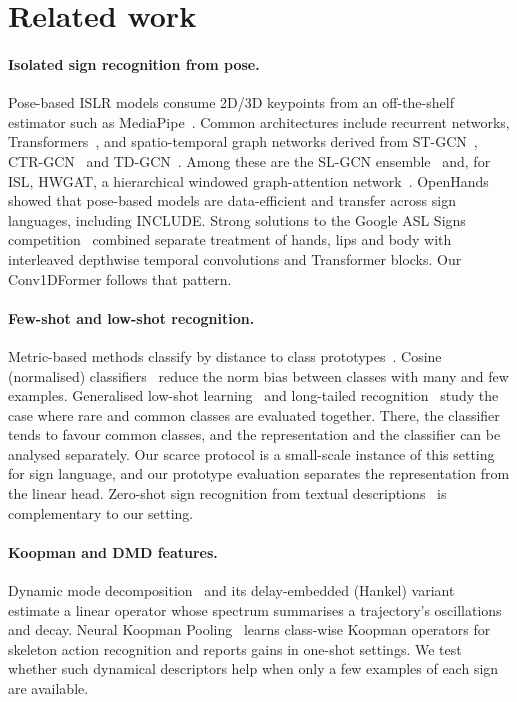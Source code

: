 \documentclass[11pt]{article}
\begin{document}
\section{Related work}

\paragraph{Isolated sign recognition from pose.}
Pose-based ISLR models consume 2D/3D keypoints from an off-the-shelf estimator such as
MediaPipe~\citep{lugaresi2019mediapipe}. Common architectures include recurrent networks,
Transformers~\citep{vaswani2017attention}, and spatio-temporal graph networks derived from
ST-GCN~\citep{yan2018stgcn}, CTR-GCN~\citep{chen2021ctrgcn} and TD-GCN~\citep{liu2024tdgcn}.
Among these are the SL-GCN ensemble~\citep{jiang2021sam} and, for ISL, HWGAT, a hierarchical
windowed graph-attention network~\citep{patra2024hwgat}. OpenHands~\citep{selvaraj2022openhands}
showed that pose-based models are data-efficient and transfer across sign languages,
including INCLUDE. Strong solutions to the Google ASL Signs competition~\citep{kaggle2023aslsigns}
combined separate treatment of hands, lips and body with interleaved depthwise temporal
convolutions and Transformer blocks. Our Conv1DFormer follows that pattern.

\paragraph{Few-shot and low-shot recognition.}
Metric-based methods classify by distance to class prototypes~\citep{snell2017proto}. Cosine
(normalised) classifiers~\citep{gidaris2018dynamic,qi2018imprinted,chen2019closer} reduce
the norm bias between classes with many and few examples. Generalised low-shot
learning~\citep{hariharan2017lowshot} and long-tailed recognition~\citep{kang2020decoupling}
study the case where rare and common classes are evaluated together. There, the classifier
tends to favour common classes, and the representation and the classifier can be analysed
separately. Our scarce protocol is a small-scale instance of this setting for sign language,
and our prototype evaluation separates the representation from the linear head. Zero-shot
sign recognition from textual descriptions~\citep{bilge2019zeroshot} is complementary to
our setting.

\paragraph{Koopman and DMD features.}
Dynamic mode decomposition~\citep{schmid2010dmd} and its delay-embedded (Hankel)
variant~\citep{arbabi2017hankel} estimate a linear operator whose spectrum summarises a
trajectory's oscillations and decay. Neural Koopman Pooling~\citep{wang2023koopman} learns
class-wise Koopman operators for skeleton action recognition and reports gains in one-shot
settings. We test whether such dynamical descriptors help when only a few examples of each
sign are available.
\end{document}
